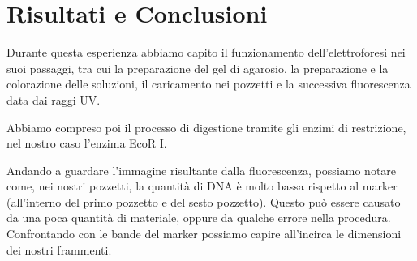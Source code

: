 \section{Risultati e Conclusioni}

Durante questa esperienza abbiamo capito il funzionamento dell'elettroforesi nei suoi passaggi,
tra cui la preparazione del gel di agarosio, la preparazione e la colorazione delle soluzioni,
il caricamento nei pozzetti e la successiva fluorescenza data dai raggi UV.

Abbiamo compreso poi il processo di digestione tramite gli enzimi di restrizione,
nel nostro caso l'enzima EcoR I.

Andando a guardare l'immagine risultante dalla fluorescenza,
possiamo notare come, nei nostri pozzetti,
la quantità di DNA è molto bassa rispetto al
marker (all'interno del primo pozzetto e del sesto pozzetto).
Questo può essere causato da una poca quantità di materiale, oppure da qualche errore nella procedura.
Confrontando con le bande del marker possiamo capire all'incirca le dimensioni dei nostri frammenti.
